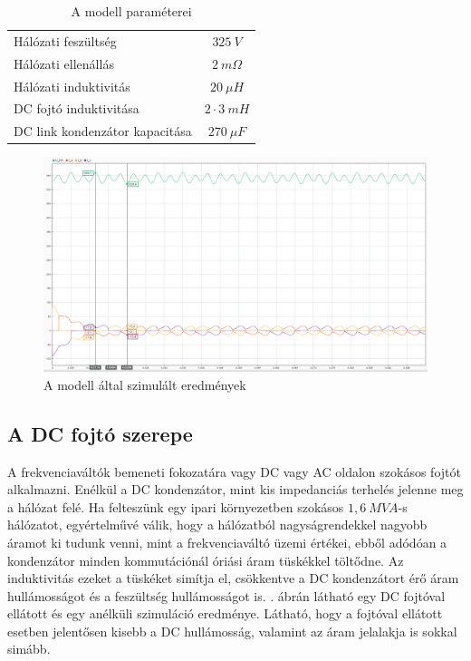 \begin{table}[H]
\centering
\begin{tabular}{lS}
Hálózati feszültség            & $325\ V$ 		\\
Hálózati ellenállás            & $2\ m\Omega$   \\
Hálózati induktivitás          & $20\ \mu{}H$    			\\
DC fojtó induktivitása         & $2 \cdot{} 3\ mH$    			\\
DC link kondenzátor kapacitása & $270\ \mu{}F $   
\end{tabular}
\caption{A modell paraméterei}
\label{parameters}
\end{table}

\begin{figure}[H]
	\centering
	\includegraphics[width = \textwidth]{figures/continous_testrun_1.png}
	\caption{A modell által szimulált eredmények} 
	\label{fig:cont_run}
\end{figure}

\subsection{A DC fojtó szerepe}

A frekvenciaváltók bemeneti fokozatára vagy DC vagy AC oldalon szokásos fojtót alkalmazni. Enélkül a DC kondenzátor, mint kis impedanciás terhelés jelenne meg a hálózat felé. Ha felteszünk egy ipari környezetben szokásos $1,6\ MVA$-s hálózatot, egyértelművé válik, hogy a hálózatból nagyságrendekkel nagyobb áramot ki tudunk venni, mint a frekvenciaváltó üzemi értékei, ebből adódóan a kondenzátor minden kommutációnál óriási áram tüskékkel töltődne. Az induktivitás ezeket a tüskéket simítja el, csökkentve a DC kondenzátort érő áram hullámosságot és a feszültség hullámosságot is. . ábrán látható egy DC fojtóval ellátott és egy anélküli szimuláció eredménye. Látható, hogy a fojtóval ellátott esetben jelentősen kisebb a DC hullámosság, valamint az áram jelalakja is sokkal simább.

